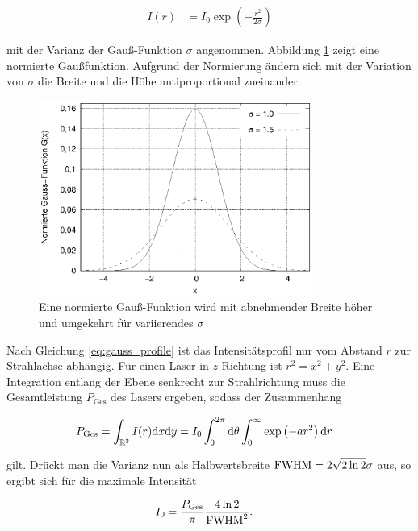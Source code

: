		\begin{align}
			I(r) &= I_0 \exp\left(-\frac{r^2}{2\sigma}\right) \label{eq:gauss_profile}
		\end{align}

		mit der Varianz der Gauß-Funktion $\sigma$ angenommen. Abbildung \ref{fig:gauss} zeigt
		eine normierte Gaußfunktion. Aufgrund der Normierung ändern sich mit der Variation von
		$\sigma$ die Breite und die Höhe antiproportional zueinander.

		\begin{figure}[!ht]
			\centering
			\includegraphics[width=0.8\textwidth]{chapter/main/theory/plt/gauss.eps}
			\caption{Eine normierte Gauß-Funktion wird mit abnehmender Breite höher und
			umgekehrt für variierendes $\sigma$}
			\label{fig:gauss}
		\end{figure}

		Nach Gleichung \eqref{eq:gauss_profile} ist das Intensitätsprofil nur vom Abstand $r$
		zur Strahlachse abhängig. Für einen Laser in $z$-Richtung ist $r^2 = x^2 + y^2$. Eine
		Integration entlang der Ebene senkrecht zur Strahlrichtung muss die Gesamtleistung
		$P_\text{Ges}$ des Lasers ergeben, sodass der Zusammenhang

		\begin{align}
			P_\text{Ges} &= \int_{\mathbb{R}^2} I(r) \dx\dx[y]
				= I_0 \int_0^{2\pi} \dx[\theta] \int_0^\infty \exp\left(-a r^2\right) \dx[r]
		\end{align}

		gilt. Drückt man die Varianz nun als Halbwertsbreite $\fwhm = 2\sqrt{2 \ln2}\sigma$ aus, so
		ergibt sich für die maximale Intensität

		\begin{align}
			I_0 &= \frac{P_\text{Ges}}{\pi} \frac{4\ln2}{\fwhm^2}
			.
		\end{align}

